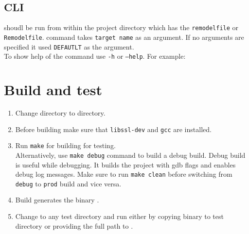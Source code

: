 \documentclass[12pt,letterpaper,titlepage, one-sided]{article}
\begin{document}
	\subsection{CLI}
	\remodel shoudl be run from within the project directory which has the \texttt{remodelfile} or \texttt{Remodelfile}. 
	\remodel command takes \texttt{target name} as an argument. If no arguments are specified it used \texttt{DEFAUTLT} as the argument.
	\\
	To show help of the command use \texttt{-h} or \texttt{--help}. For example:\\


\section{Build and test \remodel}
	\begin{enumerate}
	\item
	Change directory to \remodel directory.
	\item
	Before building \remodel make sure that \texttt{libssl-dev} and \texttt{gcc} are installed.
	\item
	Run \texttt{make} for building \remodel for testing. \\Alternatively, use \texttt{make debug} command to build a debug build. Debug build is useful while debugging. It builds the project with gdb flags and enables debug log messages. Make sure to run \texttt{make clean} before switching from \texttt{debug} to \texttt{prod} build and vice versa.
	\item
	Build generates the binary \remodel. 
	\item
	Change to any test directory and run \remodel either by copying \remodel binary to test directory or providing the full path to \remodel.
	\end{enumerate}
\end{document}
